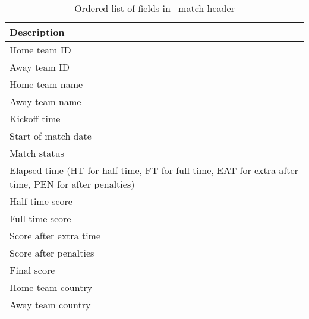 \begin{table}[H]
    \centering
    \noindent\begin{tabular}{| l |}
        \hline
        \textbf{Description} \\\hline
        Home team ID \\\hline
        Away team ID \\\hline
        Home team name \\\hline
        Away team name \\\hline
        Kickoff time \\\hline
        Start of match date \\\hline
        Match status \\\hline
        Elapsed time (HT for half time, FT for full time, EAT for extra after time, PEN for after penalties) \\\hline
        Half time score \\\hline
        Full time score \\\hline
        Score after extra time \\\hline
        Score after penalties \\\hline
        Final score \\\hline
        Home team country \\\hline
        Away team country \\\hline
    \end{tabular}
    \caption{Ordered list of fields in \whoscored\ match header}
    \label{tab:whoscored-match-header-data}
\end{table}